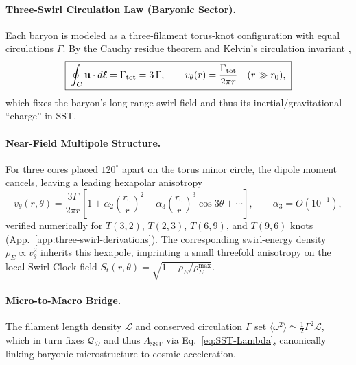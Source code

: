 \documentclass[10pt,reprint,aps,onecolumn,nofootinbib]{revtex4-2}
\begin{document}
    \paragraph{Three-Swirl Circulation Law (Baryonic Sector).}
        Each baryon is modeled as a three-filament torus-knot configuration with
        equal circulations $\Gamma$. By the Cauchy residue theorem and Kelvin’s circulation
        invariant \cite{Kelvin1869,Batchelor1967,Saffman1992},
        \begin{equation}
            \boxed{\;
            \oint_{C} \mathbf{u}\cdot d\boldsymbol{\ell} =
                \Gamma_{\rm tot} = 3\,\Gamma,
                \qquad
                v_\theta(r)=\frac{\Gamma_{\rm tot}}{2\pi r}\quad(r\gg r_0),
                \;}
            \label{eq:three-swirl-circulation}
        \end{equation}
        which fixes the baryon’s long-range swirl field and thus its inertial/gravitational
        ``charge'' in SST.

    \paragraph{Near-Field Multipole Structure.}
        For three cores placed $120^\circ$ apart on the torus minor circle, the dipole
        moment cancels, leaving a leading hexapolar anisotropy
        \begin{equation}
            \boxed{\;
            v_\theta(r,\theta)=\frac{3\Gamma}{2\pi r}\!\left[
                                                           1+\alpha_2\!\left(\frac{r_0}{r}\right)^{2}
                                                           +\alpha_3\!\left(\frac{r_0}{r}\right)^{3}\cos 3\theta+\cdots
            \right],
                \qquad
                \alpha_3=O(10^{-1}),
                \;}
            \label{eq:hexapole-expansion}
        \end{equation}
        verified numerically for $T(3,2)$, $T(2,3)$, $T(6,9)$, and $T(9,6)$ knots
        (App.~\ref{app:three-swirl-derivations}).
        The corresponding swirl-energy density $\rho_{\!E}\propto v_\theta^2$ inherits this
        hexapole, imprinting a small threefold anisotropy on the local Swirl-Clock field
        $S_t(r,\theta)=\sqrt{1-\rho_{\!E}/\rho_{\!E}^{\max}}$.

    \paragraph{Micro-to-Macro Bridge.}
        The filament length density $\mathcal{L}$ and conserved circulation $\Gamma$
        set $\langle\omega^2\rangle\simeq \tfrac12\Gamma^2\mathcal{L}$, which in turn fixes
        $\mathcal{Q}_\mathcal{D}$ and thus $\Lambda_{\!\mathrm{SST}}$ via
        Eq.~\eqref{eq:SST-Lambda}, canonically linking baryonic microstructure to cosmic
        acceleration.
\end{document}
